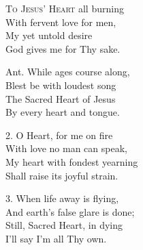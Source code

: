 
\begin{minipage}[t]{0.5\textwidth}
\lettrine{T}{o Jesus’ Heart} all burning\\
With fervent love for men,\\
My yet untold desire\\
God gives me for Thy sake.

\vskip3pt\hskip-3pt Ant. While ages course along,\\
Blest be with loudest song\\
The Sacred Heart of Jesus\\
By every heart and tongue.
\end{minipage}
\hskip3pt
\begin{minipage}[t]{0.5\textwidth}
\hskip-3pt 2. O Heart, for me on fire\\
With love no man can speak,\\
My heart with fondest yearning\\
Shall raise its joyful strain.


\vskip3pt\hskip-3pt 3. When life away is flying,\\
And earth’s false glare is done;\\
Still, Sacred Heart, in dying\\
I’ll say I’m all Thy own.
\end{minipage}

\smallskip



